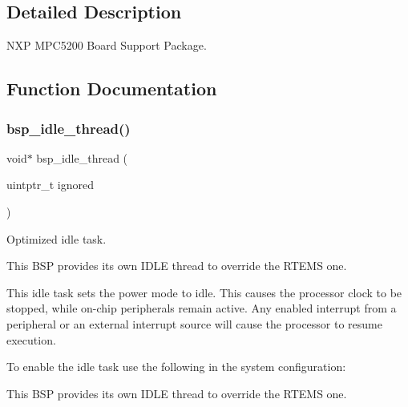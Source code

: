 \subsection{Detailed Description}
N\+XP M\+P\+C5200 Board Support Package. 



\subsection{Function Documentation}
\mbox{\label{group__RTEMSBSPsPowerPCGen5200_ga301be7085b80c41a9c5887247003c662}} 
\subsubsection{\texorpdfstring{bsp\_idle\_thread()}{bsp\_idle\_thread()}}
{\footnotesize\ttfamily void$\ast$ bsp\+\_\+idle\+\_\+thread (\begin{DoxyParamCaption}\item[{uintptr\+\_\+t}]{ignored }\end{DoxyParamCaption})}



Optimized idle task. 

This B\+SP provides its own I\+D\+LE thread to override the R\+T\+E\+MS one.

This idle task sets the power mode to idle. This causes the processor clock to be stopped, while on-\/chip peripherals remain active. Any enabled interrupt from a peripheral or an external interrupt source will cause the processor to resume execution.

To enable the idle task use the following in the system configuration\+:


\begin{DoxyCode}{0}
\DoxyCodeLine{\textcolor{preprocessor}{\#include <bsp.h>}}
\DoxyCodeLine{}
\DoxyCodeLine{\textcolor{preprocessor}{\#define CONFIGURE\_INIT}}
\DoxyCodeLine{}
\DoxyCodeLine{\textcolor{preprocessor}{\#define CONFIGURE\_IDLE\_TASK\_BODY bsp\_idle\_thread}}
\DoxyCodeLine{}
\end{DoxyCode}


This B\+SP provides its own I\+D\+LE thread to override the R\+T\+E\+MS one.

